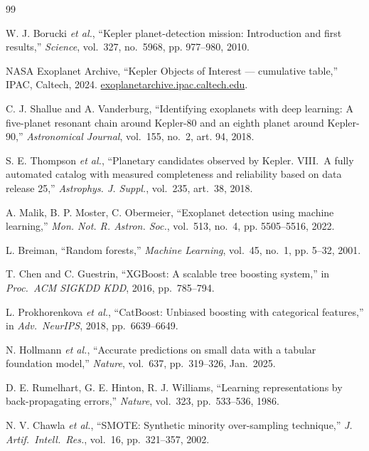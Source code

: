 \documentclass[conference]{IEEEtran}
\begin{document}
\begin{thebibliography}{99}

W. J. Borucki \emph{et al.}, ``Kepler planet-detection mission:
Introduction and first results,'' \emph{Science}, vol.~327, no.~5968,
pp. 977--980, 2010.

NASA Exoplanet Archive, ``Kepler Objects of Interest --- cumulative
table,'' IPAC, Caltech, 2024.
\href{https://exoplanetarchive.ipac.caltech.edu}
     {exoplanetarchive.ipac.caltech.edu}.

C. J. Shallue and A. Vanderburg, ``Identifying exoplanets with deep
learning: A five-planet resonant chain around Kepler-80 and an eighth
planet around Kepler-90,'' \emph{Astronomical Journal}, vol.~155, no.~2,
art. 94, 2018.

S. E. Thompson \emph{et al.}, ``Planetary candidates observed by
Kepler. VIII.\ A fully automated catalog with measured completeness
and reliability based on data release 25,''
\emph{Astrophys. J. Suppl.}, vol.~235, art.~38, 2018.

A. Malik, B. P. Moster, C. Obermeier, ``Exoplanet detection using
machine learning,'' \emph{Mon. Not. R. Astron. Soc.}, vol.~513, no.~4,
pp. 5505--5516, 2022.

L. Breiman, ``Random forests,'' \emph{Machine Learning}, vol.~45,
no.~1, pp. 5--32, 2001.

T. Chen and C. Guestrin, ``XGBoost: A scalable tree boosting system,''
in \emph{Proc.\ ACM SIGKDD KDD}, 2016, pp.~785--794.

L. Prokhorenkova \emph{et al.}, ``CatBoost: Unbiased boosting with
categorical features,'' in \emph{Adv.\ NeurIPS}, 2018, pp.~6639--6649.

N. Hollmann \emph{et al.}, ``Accurate predictions on small data with a
tabular foundation model,'' \emph{Nature}, vol.~637, pp.~319--326,
Jan.\ 2025.

D. E. Rumelhart, G. E. Hinton, R. J. Williams, ``Learning
representations by back-propagating errors,'' \emph{Nature}, vol.~323,
pp.~533--536, 1986.

N. V. Chawla \emph{et al.}, ``SMOTE: Synthetic minority
over-sampling technique,'' \emph{J. Artif.\ Intell.\ Res.}, vol.~16,
pp.~321--357, 2002.


\end{thebibliography}
\end{document}
